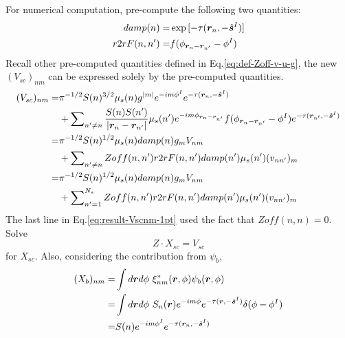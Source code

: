 \documentclass [10pt,letterpaper]{article}
\newcommand{\unitvectorsym}[1]{\hat{\vectorsym{#1}}}
\begin{document}
For numerical computation, pre-compute the following two quantities:
\begin{subequations} \label{eq:def-damp-r2rF} 
	\begin{align}
		damp(n)
		=&
		\exp
		{
			[-\tau(\vectorsym{r}_n,-\unitvectorsym{s}^I)]
		}
		\label{eq:def-tau}
		\\
		r2rF(n,n^\prime)
		=&
		f(\phi_{\vectorsym{r}_n-\vectorsym{r}_{n^\prime}} - \phi^I)
		\label{eq:def-r2rR}
	\end{align} 
\end{subequations}
Recall other pre-computed quantities defined in Eq.\eqref{eq:def-Zoff-v-u-g}, the new $(V_{sc})_{n m}$ can be expressed solely by the pre-computed quantities.
\begin{equation} \label{eq:result-Vscnm-1pt}
	\begin{split} 
		(V_{sc})_{n m}
		=&
		\pi^{-1/2}
		S(n)^{3/2}
		\mu_s(n)
		g^{\lvert m \rvert}
		e^{-i m \phi^I }
		e^{-\tau(\vectorsym{r}_n,-\unitvectorsym{s}^I)} 
		\\
		&+
		\sum \nolimits_{n^\prime \neq n}
		\frac
		{S(n)S(n^\prime)}
		{\lvert \vectorsym{r}_n - \vectorsym{r}_{n^\prime} \rvert} 
		\mu_s(n^\prime)
		e^{-i m \phi_{\vectorsym{r}_n - \vectorsym{r}_{n^\prime}}}
		f(\phi_{\vectorsym{r}_n - \vectorsym{r}_{n^\prime}}-\phi^I)
		e^{-\tau(\vectorsym{r}_{n^\prime},-\unitvectorsym{s}^I)} 
		\\
		=&
		\pi^{-1/2}
		S(n)^{1/2}
		\mu_s(n)
		damp(n)
		g_m
		V_{n m}
		\\
		&+
		\sum \nolimits_{n^\prime \neq n}
		Zoff(n,n^\prime)
		r2rF(n,n^\prime)
		damp(n^\prime)
		\mu_s(n^\prime)
		(v_{n n^\prime})_m
		\\
		=&
		\pi^{-1/2}
		S(n)^{1/2}
		\mu_s(n)
		damp(n)
		g_m
		V_{n m}
		\\
		&+
		\sum \nolimits_{n^\prime=1}^{N_s}
		Zoff(n,n^\prime)
		r2rF(n,n^\prime)
		damp(n^\prime)
		\mu_s(n^\prime)
		(v_{n n^\prime})_m
	\end{split}
\end{equation}
The last line in Eq.\eqref{eq:result-Vscnm-1pt} used the fact that $Zoff(n,n)=0$.
\\
Solve
\begin{equation} \label{eq:Z-Xsc-Vsc}
	Z\cdot X_{sc}=V_{sc}
\end{equation}
for $X_{sc}$.
Also, considering the contribution from $\psi_b$,
\begin{equation} \label{eq:result-Xbnm-1pt}
	\begin{split} 
		(X_b)_{n m}
		=&
		\int d\vectorsym{r} d\phi
		\ \xi^*_{n m}(\vectorsym{r},\phi)
		\psi_b(\vectorsym{r},\phi)
		\\
		=& 
		\int d\vectorsym{r} d\phi
		\ S_n(\vectorsym{r})
		e^{-i m \phi}
		e^{-\tau(\vectorsym{r},-\unitvectorsym{s}^I)}
		\delta(\phi-\phi^I) 
		\\
		=& 
		S(n)
		e^{-i m \phi^I}
		e^{-\tau(\vectorsym{r}_n,-\unitvectorsym{s}^I)}
	\end{split}
\end{equation}
\end{document}
